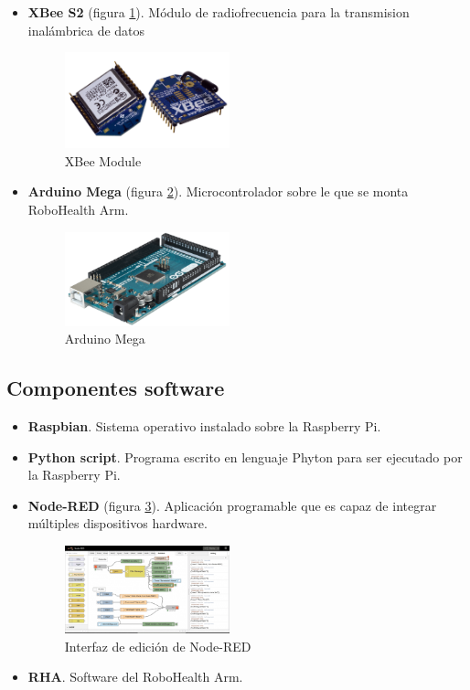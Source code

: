 \begin{itemize}
\item \textbf{XBee S2} (figura \ref{fig:Xbee}). Módulo de radiofrecuencia para la transmision inalámbrica de datos

\begin{figure}[H]
\centering
\includegraphics[width=0.45\textwidth]{figuras/XBee.png}
\caption{XBee Module}
\label{fig:Xbee}
\end{figure}

\item \textbf{Arduino Mega} (figura \ref{fig:AMega}). Microcontrolador sobre le que se monta RoboHealth Arm.

\begin{figure}[H]
\centering
\includegraphics[width=0.45\textwidth]{figuras/AMega.png}
\caption{Arduino Mega}
\label{fig:AMega}
\end{figure}

\end{itemize}

\subsection{Componentes software}
\begin{itemize}
\item \textbf{Raspbian}. Sistema operativo instalado sobre la Raspberry Pi.
\item \textbf{Python script}. Programa escrito en lenguaje Phyton para ser ejecutado por la Raspberry Pi.
\item \textbf{Node-RED} (figura \ref{fig:NodeRED}). Aplicación programable que es capaz de integrar múltiples dispositivos hardware.

\begin{figure}[H]
\centering
\includegraphics[width=0.45\textwidth]{figuras/NodeRED.png}
\caption{Interfaz de edición de Node-RED}
\label{fig:NodeRED}
\end{figure}

\item \textbf{RHA}. Software del RoboHealth Arm.

\end{itemize}

